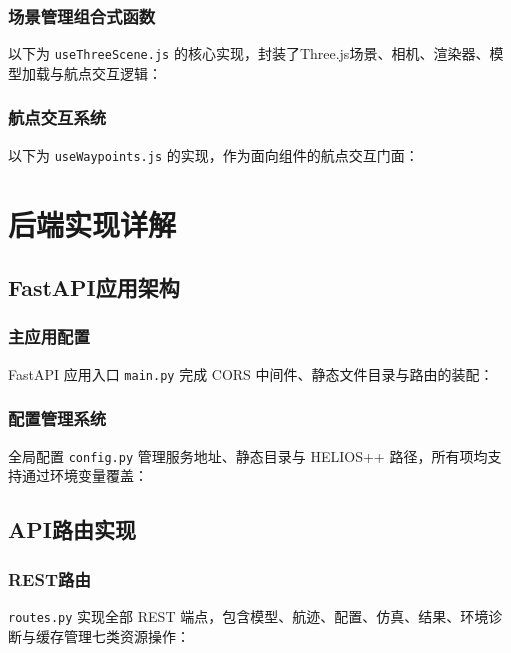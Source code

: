 \documentclass[a4paper,fleqn]{cas-sc}
\begin{document}
\subsubsection{场景管理组合式函数}
以下为 \texttt{useThreeScene.js} 的核心实现，封装了Three.js场景、相机、渲染器、模型加载与航点交互逻辑：



\subsubsection{航点交互系统}
以下为 \texttt{useWaypoints.js} 的实现，作为面向组件的航点交互门面：



\section{后端实现详解}\label{sec:backend}

\subsection{FastAPI应用架构}

\subsubsection{主应用配置}
FastAPI 应用入口 \texttt{main.py} 完成 CORS 中间件、静态文件目录与路由的装配：



\subsubsection{配置管理系统}
全局配置 \texttt{config.py} 管理服务地址、静态目录与 HELIOS++ 路径，所有项均支持通过环境变量覆盖：



\subsection{API路由实现}

\subsubsection{REST路由}
\texttt{routes.py} 实现全部 REST 端点，包含模型、航迹、配置、仿真、结果、环境诊断与缓存管理七类资源操作：
\end{document}
